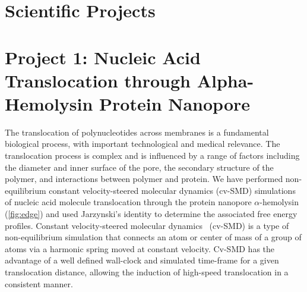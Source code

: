 \documentclass[a4paper,10pt]{article}
\begin{document}
\section{Scientific Projects}



\section*{Project 1: Nucleic Acid Translocation through Alpha-Hemolysin Protein Nanopore}

The translocation of polynucleotides across membranes is a fundamental biological process, with important technological and medical relevance.  The translocation process is complex and is influenced by a range of factors including the diameter and inner surface of the pore, the secondary structure of the polymer, and interactions between polymer and protein. We have performed non-equilibrium constant velocity-steered molecular dynamics (cv-SMD) simulations of nucleic acid molecule translocation through the protein nanopore $\alpha$-hemolysin (\ref{fig:edge}) and used Jarzynski's identity%
to determine the associated free energy profiles. Constant velocity-steered molecular dynamics~\cite{namd} (cv-SMD) is a type of non-equilibrium simulation that connects an atom or center of mass of a group of atoms via a harmonic spring moved at constant velocity. Cv-SMD has the advantage of a well defined wall-clock and simulated time-frame for a given translocation distance, allowing the induction of high-speed translocation in a consistent manner.
\end{document}
